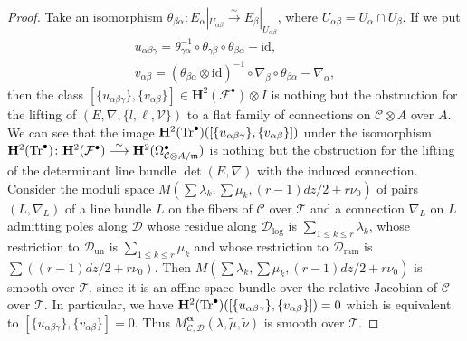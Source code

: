 \documentclass[pdftex]{sigma}
\numberwithin{equation}{section}
\newcommand{\Tr}{\mathop{\rm Tr}\nolimits}
\newcommand{\balpha}{\boldsymbol \alpha}
\begin{document}
\begin{proof}
Take an isomorphism
$\theta_{\beta\alpha}\colon E_{\alpha}|_{U_{\alpha\beta}}
\stackrel{\sim}\longrightarrow E_{\beta}|_{U_{\alpha\beta}}$,
where $U_{\alpha\beta}=U_{\alpha}\cap U_{\beta}$.
If we put
\begin{gather*}
 u_{\alpha\beta\gamma}
 =
 \theta_{\gamma\alpha}^{-1}\circ\theta_{\gamma\beta}\circ\theta_{\beta\alpha}-\mathrm{id},
 \\
 v_{\alpha\beta}
 =
 (\theta_{\beta\alpha}\otimes\mathrm{id})^{-1}\circ\nabla_{\beta}\circ\theta_{\beta\alpha}
 -\nabla_{\alpha},
\end{gather*}
then the class
$[\{u_{\alpha\beta\gamma}\},\{v_{\alpha\beta}\}]
\in \mathbf{H}^2({\mathcal F}^{\bullet})\otimes I$
is nothing but the obstruction for the lifting of
$(E,\nabla,\{l,\ell,{\mathcal V}\})$
to a flat family of connections on ${\mathcal C}\otimes A$ over $A$.
We can see that the image
$\mathbf{H}^2(\Tr^{\bullet})([\{u_{\alpha\beta\gamma}\},\{v_{\alpha\beta}\}])$
under the isomorphism
$\mathbf{H}^2(\Tr^{\bullet})\colon
\mathbf{H}^2({\mathcal F}^{\bullet})\stackrel{\sim}\longrightarrow
\mathbf{H}^2(\Omega^{\bullet}_{{\mathcal C}\otimes A/\mathfrak{m}})$
is nothing but the obstruction for the lifting of
the determinant line bundle $\det (E,\nabla)$
with the induced connection.
Consider the moduli space
$M(\sum\lambda_k,\sum\mu_k,(r-1)dz/2+r\nu_0)$
of pairs $(L,\nabla_L)$
of a line bundle $L$ on the fibers of ${\mathcal C}$ over ${\mathcal T}$ and a connection
$\nabla_L$ on $L$ admitting poles along ${\mathcal D}$
whose residue along ${\mathcal D}_{\mathrm{log}}$ is
$\sum_{1\leq k \leq r}\lambda_k$,
whose restriction to ${\mathcal D}_{\mathrm{un}}$ is
$\sum_{1\leq k\leq r}\mu_k$
and whose restriction to ${\mathcal D}_{\mathrm{ram}}$ is
$\sum((r-1)dz/2+ r\nu_0)$.
Then $M(\sum\lambda_k,\sum\mu_k,(r-1)dz/2+r\nu_0)$ is smooth over ${\mathcal T}$,
since it is an affine space bundle over the relative Jacobian of
${\mathcal C}$ over ${\mathcal T}$.
In particular, we have
$\mathbf{H}^2(\Tr^{\bullet})([\{u_{\alpha\beta\gamma}\},\{v_{\alpha\beta}\}])=0$
which is equivalent to
$[\{u_{\alpha\beta\gamma}\},\{v_{\alpha\beta}\}]=0$.
Thus $M^{\balpha}_{{\mathcal C},{\mathcal D}}(\lambda,\tilde{\mu},\tilde{\nu})$
is smooth over ${\mathcal T}$.


\end{proof}
\end{document}
